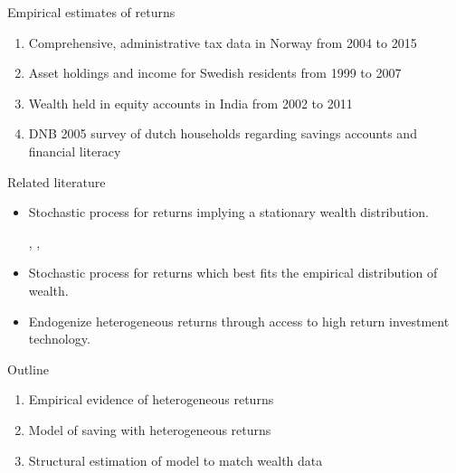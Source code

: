 \documentclass{beamer}
\begin{document}
\begin{frame}{Empirical estimates of returns}

   \small
   \begin{enumerate}
    \item Comprehensive, administrative tax data in Norway from 2004 to 2015  \parencite{aflgdmlp20}
    \item Asset holdings and income for Swedish residents from 1999 to 2007 \parencite{lblcps18}
    \item Wealth held in equity accounts in India from 2002 to 2011 \parencite{Campbell2019}
    \item DNB 2005 survey of dutch households regarding savings accounts and financial literacy \parencite{Deuflhard2018}
    \end{enumerate}
   
  
\end{frame}

\begin{frame}{Related literature}
\begin{itemize}
\item Stochastic process for returns implying a stationary wealth distribution.
\par  \parencite{Benhabib2011}, \parencite{Benhabib2015}, \parencite{Benhabib2016}

\item Stochastic process for returns which best fits the empirical distribution of wealth.
\par \parencite{Benhabib2019}

\item Endogenize heterogeneous returns through access to high return investment technology.
\par  \parencite{Guler2022}
\end{itemize}
\end{frame}
\begin{frame}{Outline}
\begin{enumerate}
\item Empirical evidence of heterogeneous returns
\item Model of saving with heterogeneous returns
\item Structural estimation of model to match wealth data
\end{enumerate}
\end{frame}
\end{document}
